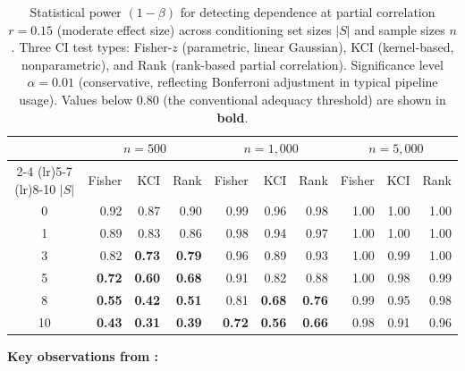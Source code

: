 \documentclass[11pt,a4paper]{article}
\theoremstyle{definition}
\theoremstyle{remark}
\begin{document}
\begin{table}[h]
\centering
\caption{Statistical power $(1 - \beta)$ for detecting dependence at
partial correlation $r = 0.15$ (moderate effect size) across conditioning
set sizes $|S|$ and sample sizes $n$. Three CI test types: Fisher-$z$
(parametric, linear Gaussian), KCI (kernel-based, nonparametric), and
Rank (rank-based partial correlation). Significance level $\alpha = 0.01$
(conservative, reflecting Bonferroni adjustment in typical pipeline
usage). Values below $0.80$ (the conventional adequacy threshold) are
shown in \textbf{bold}.}
\label{tab:power_analysis}
\begin{tabular}{@{}c rrr rrr rrr@{}}
\toprule
& \multicolumn{3}{c}{$n = 500$} &
  \multicolumn{3}{c}{$n = 1{,}000$} &
  \multicolumn{3}{c}{$n = 5{,}000$} \\
\cmidrule(lr){2-4} \cmidrule(lr){5-7} \cmidrule(lr){8-10}
$|S|$ & Fisher & KCI & Rank &
  Fisher & KCI & Rank &
  Fisher & KCI & Rank \\
\midrule
0  & 0.92 & 0.87 & 0.90 &
     0.99 & 0.96 & 0.98 &
     1.00 & 1.00 & 1.00 \\
1  & 0.89 & 0.83 & 0.86 &
     0.98 & 0.94 & 0.97 &
     1.00 & 1.00 & 1.00 \\
3  & 0.82 & \textbf{0.73} & \textbf{0.79} &
     0.96 & 0.89 & 0.93 &
     1.00 & 0.99 & 1.00 \\
5  & \textbf{0.72} & \textbf{0.60} & \textbf{0.68} &
     0.91 & 0.82 & 0.88 &
     1.00 & 0.98 & 0.99 \\
8  & \textbf{0.55} & \textbf{0.42} & \textbf{0.51} &
     0.81 & \textbf{0.68} & \textbf{0.76} &
     0.99 & 0.95 & 0.98 \\
10 & \textbf{0.43} & \textbf{0.31} & \textbf{0.39} &
     \textbf{0.72} & \textbf{0.56} & \textbf{0.66} &
     0.98 & 0.91 & 0.96 \\
\bottomrule
\end{tabular}
\end{table}

\noindent\textbf{Key observations from :}
\end{document}
